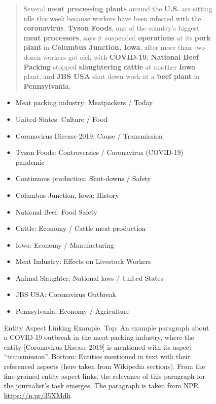 
\begin{figure}
\justify
\begin{quote}
Several \textbf{meat processing plants} around the \textbf{U.S.} are sitting idle this week because workers have been infected with the \textbf{coronavirus}. \textbf{Tyson Foods}, one of the country's biggest \textbf{meat processors}, says it suspended \textbf{operations} at its \textbf{pork plant} in \textbf{Columbus Junction, Iowa}, after more than two dozen workers got sick with \textbf{COVID-19}. \textbf{National Beef Packing} stopped \textbf{slaughtering} \textbf{cattle} at another \textbf{Iowa} plant, and \textbf{JBS USA} shut down work at a \textbf{beef plant} in \textbf{Pennsylvania}.
\end{quote}

\begin{small}
\begin{itemize}
\item Meat packing industry:  Meatpackers / Today
\item United States: Culture / Food
\item Coronavirus Disease 2019: Cause / Transmission
\item Tyson Foods: Controversies / Coronavirus (COVID-19) pandemic
\item Continuous production: Shut-downs / Safety
\item Columbus Junction, Iowa: History
\item National Beef: Food Safety
\item Cattle: Economy / Cattle meat production
\item Iowa: Economy / Manufacturing
\item Meat Industry: Effects on Livestock Workers
\item Animal Slaughter: National laws / United States
\item JBS USA: Coronavirus Outbreak
\item Pennsylvania: Economy / Agriculture
\end{itemize}
\end{small}


\caption{Entity Aspect Linking Example. Top: An example paragraph about a COVID-19 outbreak in the meat packing industry, where the entity [Coronavirus Disease 2019] is mentioned with its aspect ``transmission''.  Bottom: Entities mentioned in text with their referenced aspects (here taken from Wikipedia sections). From the fine-grained entity aspect links, the relevance of this paragraph for the journalist's task emerges. The paragraph is taken from NPR \url{https://n.pr/35XMdli}.}
\label{fig:introexample}

\end{figure}